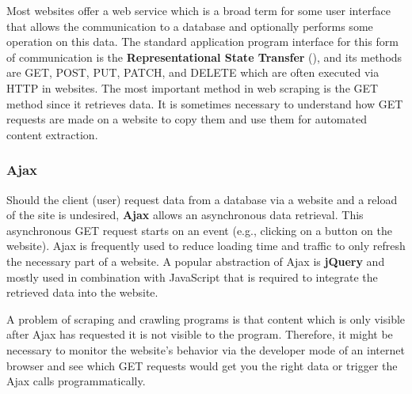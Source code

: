 Most websites offer a web service which is a broad term for some user interface that allows the communication to a database and optionally performs some operation on this data. The standard application program interface for this form of communication is the \textbf{Representational State Transfer} (), and its methods are GET, POST, PUT, PATCH, and DELETE which are often executed via HTTP in websites. The most important method in web scraping is the GET method since it retrieves data. It is sometimes necessary to understand how GET requests are made on a website to copy them and use them for automated content extraction.

\subsubsection{Ajax}

Should the client (user) request data from a database via a website and a reload of the site is undesired, \textbf{Ajax} allows an asynchronous data retrieval. This asynchronous GET request starts on an event (e.g., clicking on a button on the website). Ajax is frequently used to reduce loading time and traffic to only refresh the necessary part of a website. A popular abstraction of Ajax is \textbf{jQuery} and mostly used in combination with JavaScript that is required to integrate the retrieved data into the website.

A problem of scraping and crawling programs is that content which is only visible after Ajax has requested it is not visible to the program. Therefore, it might be necessary to monitor the website's behavior via the developer mode of an internet browser and see which GET requests would get you the right data or trigger the Ajax calls programmatically.
